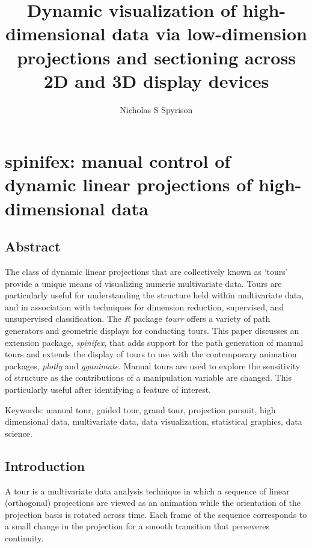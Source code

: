 \documentclass{monashthesis}
\author{Nicholas S Spyrison}
\title{Dynamic visualization of high-dimensional data via low-dimension
projections and sectioning across 2D and 3D display devices}
\begin{document}

\titlepage

{\sf\tighttoc\doublespacing}

\chapter{spinifex: manual control of dynamic linear projections of
high-dimensional
data}\label{spinifex-manual-control-of-dynamic-linear-projections-of-high-dimensional-data}

\section{Abstract}\label{abstract}

The class of dynamic linear projections that are collectively known as
`tours' provide a unique means of visualizing numeric multivariate data.
Tours are particularly useful for understanding the structure held
within multivariate data, and in association with techniques for
dimension reduction, supervised, and unsupervised classification. The
\emph{R} package \emph{tourr} offers a variety of path generators and
geometric displays for conducting tours. This paper discusses an
extension package, \emph{spinifex}, that adds support for the path
generation of manual tours and extends the display of tours to use with
the contemporary animation packages, \emph{plotly} and \emph{gganimate}.
Manual tours are used to explore the sensitivity of structure as the
contributions of a manipulation variable are changed. This particularly
useful after identifying a feature of interest.

Keywords: manual tour, guided tour, grand tour, projection pursuit, high
dimensional data, multivariate data, data visualization, statistical
graphics, data science.

\section{Introduction}\label{introduction}

A tour is a multivariate data analysis technique in which a sequence of
linear (orthogonal) projections are viewed as an animation while the
orientation of the projection basis is rotated across time. Each frame
of the sequence corresponds to a small change in the projection for a
smooth transition that perseveres continuity.
\end{document}
